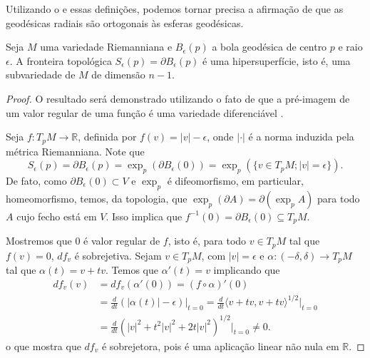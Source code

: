 Utilizando o  e essas definições, podemos tornar precisa a afirmação de que as geodésicas radiais são ortogonais às esferas geodésicas.
\begin{lemma}
    \label{lem:esfera-hipersuperficie}
    Seja $M$ uma variedade Riemanniana e $B_{\epsilon}(p)$ a bola geodésica de centro $p$ e raio $\epsilon$. A fronteira topológica $S_{\epsilon}(p)=\partial B_{\epsilon}(p)$ é uma hipersuperfície, isto é, uma subvariedade de $M$ de dimensão $n-1$.
    \begin{proof}

        O resultado será demonstrado utilizando o fato de que a pré-imagem de um valor regular de uma função é uma variedade diferenciável \cite{doCarmo1992}.

        Seja $f: T_pM \to \mathbb{R}$, definida por $f(v) = |v| - \epsilon$, onde $|\cdot|$ é a norma induzida pela métrica Riemanniana.
        Note que
        \begin{equation*}
            S_{\epsilon}(p)=\partial B_\epsilon(p) = \exp_p(\partial B_\epsilon(0)) = \exp_{p}(\{ v \in T_{p}M; |v|=\epsilon \}).
        \end{equation*}
        De fato, como $\partial B_\epsilon(0) \subset V$ e $\exp_p$ é difeomorfismo, em particular, homeomorfismo, temos, da topologia, que $\exp_p(\partial A) = \partial(\exp_p A)$ para todo $A$ cujo fecho está em $V$. Isso implica que $f ^{-1}(0)=\partial B_{\epsilon}(0)\subseteq T_{p}M$.

        Mostremos que $0$ é valor regular de $f$, isto é, para todo $v \in T_pM$ tal que $f(v) = 0$, $df_v$ é sobrejetiva.
        Sejam $v \in T_{p}M$, com $|v|=\epsilon$ e    $\alpha: (-\delta, \delta) \to T_pM$ tal que $\alpha(t) = v + tv$. Temos que $\alpha'(t) = v$ implicando que
        \begin{align*}
            df_v(v) & = df_v(\alpha'(0))   = (f \circ \alpha)'(0)                                                                       \\
                    & = \frac{d}{dt}(|\alpha(t)| - \epsilon) \Big|_{t=0}   =  \frac{d}{dt} \langle v+tv, v+tv \rangle^{1/2} \Big|_{t=0} \\
                    & = \frac{d}{dt} (|v|^2 + t^2|v|^2 + 2t|v|^2)^{1/2}\Big|_{t=0} \neq 0.
        \end{align*}
        o que mostra que $df_{v}$ é sobrejetora, pois é uma aplicação linear não nula em $\mathbb{R}$.
    \end{proof}
\end{lemma}
